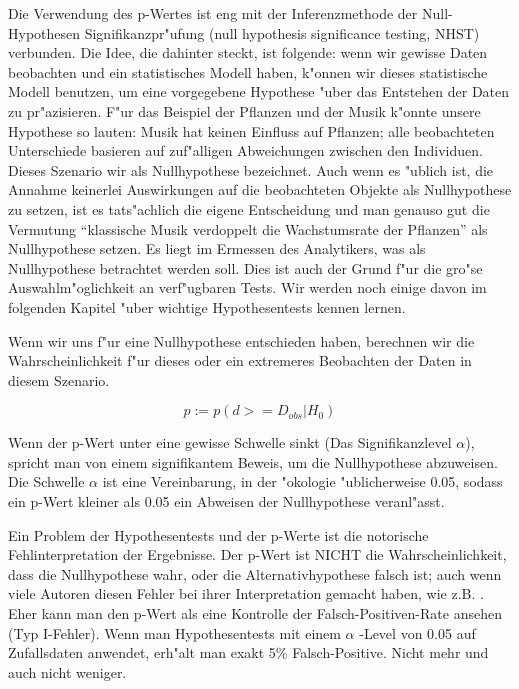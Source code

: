 \documentclass[a4paper,twoside]{tufte-book}\usepackage[]{graphicx}\usepackage[]{color}
\begin{document}
Die Verwendung des p-Wertes ist eng mit der Inferenzmethode der Null-Hypothesen Signifikanzpr"ufung (null hypothesis significance testing, NHST) verbunden. Die Idee, die dahinter steckt, ist folgende: wenn wir gewisse Daten beobachten und ein statistisches Modell haben, k"onnen wir dieses statistische Modell benutzen, um eine vorgegebene Hypothese "uber das Entstehen der Daten zu pr"azisieren. F"ur das Beispiel der Pflanzen und der Musik k"onnte unsere Hypothese so lauten: Musik hat keinen Einfluss auf Pflanzen; alle beobachteten Unterschiede basieren auf zuf"alligen Abweichungen zwischen den Individuen. Dieses Szenario wir als Nullhypothese bezeichnet.  Auch wenn es "ublich ist, die Annahme keinerlei Auswirkungen auf die beobachteten Objekte als Nullhypothese zu setzen, ist es tats"achlich die eigene Entscheidung und man genauso gut die Vermutung "`klassische Musik verdoppelt die Wachstumsrate der Pflanzen"' als Nullhypothese setzen. Es liegt im Ermessen des Analytikers, was als Nullhypothese betrachtet werden soll. Dies ist auch der Grund f"ur die gro"se Auswahlm"oglichkeit an verf"ugbaren Tests. Wir werden noch einige davon im folgenden Kapitel "uber wichtige Hypothesentests kennen lernen.

Wenn wir uns f"ur eine Nullhypothese entschieden haben, berechnen wir die Wahrscheinlichkeit f"ur dieses oder ein extremeres Beobachten der Daten in diesem Szenario.  

\begin{equation}
p := p(d >= D_{obs} | H_0)
\end{equation}

Wenn der p-Wert unter eine gewisse Schwelle sinkt (Das Signifikanzlevel $\alpha$), spricht man von einem signifikantem Beweis, um die Nullhypothese abzuweisen. Die Schwelle $\alpha$ ist eine Vereinbarung, in der "okologie "ublicherweise 0.05, sodass ein p-Wert kleiner als 0.05 ein Abweisen der Nullhypothese veranl"asst.  

Ein Problem der Hypothesentests und der p-Werte ist die notorische Fehlinterpretation der Ergebnisse. Der p-Wert ist NICHT die Wahrscheinlichkeit, dass die Nullhypothese wahr, oder die Alternativhypothese falsch ist; auch wenn viele Autoren diesen Fehler bei ihrer Interpretation gemacht haben, wie z.B. \citep[][]{Cohen-earthisround-1994}. Eher kann man den p-Wert als eine Kontrolle der Falsch-Positiven-Rate ansehen (Typ I-Fehler). Wenn man Hypothesentests mit einem $\alpha$ -Level von 0.05 auf Zufallsdaten anwendet, erh"alt man exakt 5\% Falsch-Positive. Nicht mehr und auch nicht weniger.  
\end{document}
